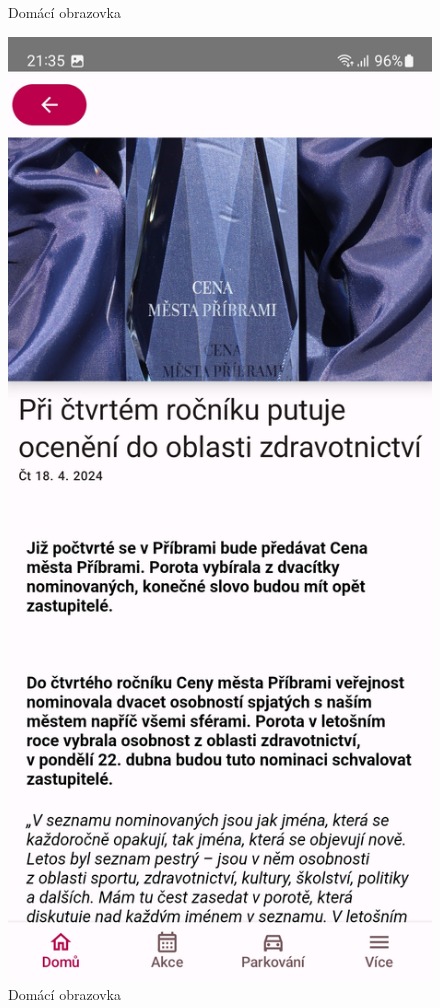 \begin{figure}[H]
    \caption{Domácí obrazovka}
  \endminipage\hfill
    \includegraphics[width=\linewidth]{screens/1e.jpg}
    \caption{Domácí obrazovka}
  \endminipage\hfill
\end{figure}

